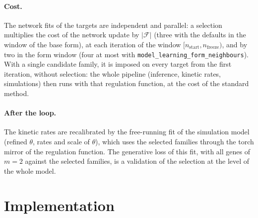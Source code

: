 \documentclass[a4paper, 11pt]{article}
\newcommand{\F}{\mathcal{F}}
\theoremstyle{plain}
\theoremstyle{remark}
\begin{document}
\paragraph{Cost.} The network fits of the targets are independent and parallel: a selection multiplies the cost of the network update by $|\F|$ (three with the defaults in the window of the base form), at each iteration of the window $[n_{\mathrm{start}}, n_{\mathrm{freeze}})$, and by two in the form window (four at most with \texttt{model\_learning\_form\_neighbours}). With a single candidate family, it is imposed on every target from the first iteration, without selection: the whole pipeline (inference, kinetic rates, simulations) then runs with that regulation function, at the cost of the standard method.

\paragraph{After the loop.} The kinetic rates are recalibrated by the free-running fit of the simulation model (refined $\theta$, rates and scale of $\theta$), which uses the selected families through the torch mirror of the regulation function. The generative loss of this fit, with all genes of $m = 2$ against the selected families, is a validation of the selection at the level of the whole model.

\section{Implementation}\label{sec:implementation}
\end{document}
